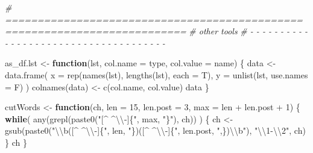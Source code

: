 \documentclass[
]{article}
\newenvironment{Shaded}{\begin{snugshade}}{\end{snugshade}}
\newcommand{\AttributeTok}[1]{\textcolor[rgb]{0.77,0.63,0.00}{#1}}
\newcommand{\CommentTok}[1]{\textcolor[rgb]{0.56,0.35,0.01}{\textit{#1}}}
\newcommand{\ControlFlowTok}[1]{\textcolor[rgb]{0.13,0.29,0.53}{\textbf{#1}}}
\newcommand{\DecValTok}[1]{\textcolor[rgb]{0.00,0.00,0.81}{#1}}
\newcommand{\FunctionTok}[1]{\textcolor[rgb]{0.00,0.00,0.00}{#1}}
\newcommand{\NormalTok}[1]{#1}
\newcommand{\OtherTok}[1]{\textcolor[rgb]{0.56,0.35,0.01}{#1}}
\newcommand{\SpecialCharTok}[1]{\textcolor[rgb]{0.00,0.00,0.00}{#1}}
\newcommand{\StringTok}[1]{\textcolor[rgb]{0.31,0.60,0.02}{#1}}
\begin{document}
\begin{Shaded}
\begin{Highlighting}[]
\CommentTok{\# ==========================================================================}
\CommentTok{\# other tools}
\CommentTok{\# {-} {-} {-} {-} {-} {-} {-} {-} {-} {-} {-} {-} {-} {-} {-} {-} {-} {-} {-} {-} {-} {-} {-} {-} {-} {-} {-} {-} {-} {-} {-} {-} {-} {-} {-} {-} {-}}

\NormalTok{as\_df.lst }\OtherTok{\textless{}{-}} \ControlFlowTok{function}\NormalTok{(lst, }\AttributeTok{col.name =} \StringTok{\textquotesingle{}type\textquotesingle{}}\NormalTok{, }\AttributeTok{col.value =} \StringTok{\textquotesingle{}name\textquotesingle{}}\NormalTok{) \{}
\NormalTok{  data }\OtherTok{\textless{}{-}} \FunctionTok{data.frame}\NormalTok{(}
    \AttributeTok{x =} \FunctionTok{rep}\NormalTok{(}\FunctionTok{names}\NormalTok{(lst), }\FunctionTok{lengths}\NormalTok{(lst), }\AttributeTok{each =}\NormalTok{ T), }
    \AttributeTok{y =} \FunctionTok{unlist}\NormalTok{(lst, }\AttributeTok{use.names =}\NormalTok{ F)}
\NormalTok{  )}
  \FunctionTok{colnames}\NormalTok{(data) }\OtherTok{\textless{}{-}} \FunctionTok{c}\NormalTok{(col.name, col.value)}
\NormalTok{  data}
\NormalTok{\}}

\NormalTok{cutWords }\OtherTok{\textless{}{-}} \ControlFlowTok{function}\NormalTok{(ch, }\AttributeTok{len =} \DecValTok{15}\NormalTok{, }\AttributeTok{len.post =} \DecValTok{3}\NormalTok{, }\AttributeTok{max =}\NormalTok{ len }\SpecialCharTok{+}\NormalTok{ len.post }\SpecialCharTok{+} \DecValTok{1}\NormalTok{) \{}
  \ControlFlowTok{while}\NormalTok{( }\FunctionTok{any}\NormalTok{(}\FunctionTok{grepl}\NormalTok{(}\FunctionTok{paste0}\NormalTok{(}\StringTok{"[\^{} \^{}}\SpecialCharTok{\textbackslash{}\textbackslash{}}\StringTok{{-}]\{"}\NormalTok{, max, }\StringTok{"\}"}\NormalTok{), ch)) ) \{}
\NormalTok{    ch }\OtherTok{\textless{}{-}} \FunctionTok{gsub}\NormalTok{(}\FunctionTok{paste0}\NormalTok{(}\StringTok{"}\SpecialCharTok{\textbackslash{}\textbackslash{}}\StringTok{b([\^{} \^{}}\SpecialCharTok{\textbackslash{}\textbackslash{}}\StringTok{{-}]\{"}\NormalTok{, len, }\StringTok{"\})([\^{} \^{}}\SpecialCharTok{\textbackslash{}\textbackslash{}}\StringTok{{-}]\{"}\NormalTok{, len.post, }\StringTok{",\})}\SpecialCharTok{\textbackslash{}\textbackslash{}}\StringTok{b"}\NormalTok{), }\StringTok{"}\SpecialCharTok{\textbackslash{}\textbackslash{}}\StringTok{1{-}}\SpecialCharTok{\textbackslash{}\textbackslash{}}\StringTok{2"}\NormalTok{, ch)}
\NormalTok{  \}}
\NormalTok{  ch}
\NormalTok{\}}


\end{Highlighting}
\end{Shaded}
\end{document}
